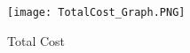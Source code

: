 \documentclass[a4paper]{IEEEtran}
\begin{document}
\begin{figure}[H]
	\centering
	\texttt{[image: TotalCost\_Graph.PNG]}
	\caption{Total Cost}
	\label{fig:cost}
\end{figure}
%
%



%
%
\end{document}
